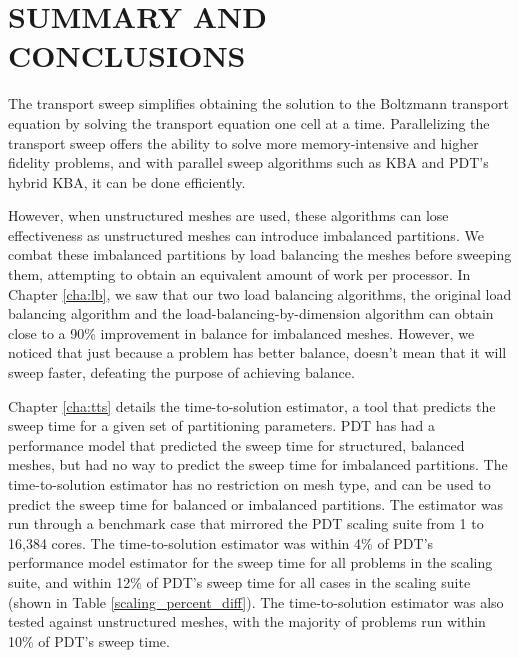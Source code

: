 %
%
%
%



\chapter{SUMMARY AND CONCLUSIONS \label{cha:Summary}}

The transport sweep simplifies obtaining the solution to the Boltzmann transport equation by solving the transport equation one cell at a time.
Parallelizing the transport sweep offers the ability to solve more memory-intensive and higher fidelity problems, and with parallel sweep algorithms such as KBA and PDT's hybrid KBA, it can be done efficiently.

However, when unstructured meshes are used, these algorithms can lose effectiveness as unstructured meshes can introduce imbalanced partitions.
We combat these imbalanced partitions by load balancing the meshes before sweeping them, attempting to obtain an equivalent amount of work per processor.
In Chapter \ref{cha:lb}, we saw that our two load balancing algorithms, the original load balancing algorithm and the load-balancing-by-dimension algorithm can obtain close to a 90\% improvement in balance for imbalanced meshes. However, we noticed that just because a problem has better balance, doesn't mean that it will sweep faster, defeating the purpose of achieving balance.

Chapter \ref{cha:tts} details the time-to-solution estimator, a tool that predicts the sweep time for a given set of partitioning parameters.
PDT has had a performance model that predicted the sweep time for structured, balanced meshes, but had no way to predict the sweep time for imbalanced partitions.
The time-to-solution estimator has no restriction on mesh type, and can be used to predict the sweep time for balanced or imbalanced partitions.
The estimator was run through a benchmark case that mirrored the PDT scaling suite from 1 to 16,384 cores.
The time-to-solution estimator was within 4\% of PDT's performance model estimator for the sweep time for all problems in the scaling suite, and within 12\% of PDT's sweep time for all cases in the scaling suite (shown in Table \ref{scaling_percent_diff}).
The time-to-solution estimator was also tested against unstructured meshes, with the majority of problems run within 10\% of PDT's sweep time. 

